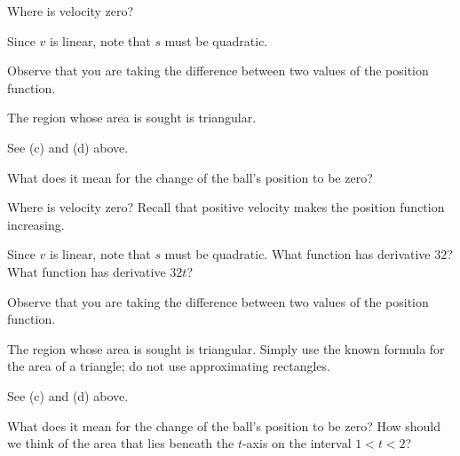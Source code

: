 \begin{smallhint}
\ba
	\item Where is velocity zero?
	\item Since $v$ is linear, note that $s$ must be quadratic.
	\item Observe that you are taking the difference between two values of the position function.
	\item The region whose area is sought is triangular.
	\item See (c) and (d) above.
	\item What does it mean for the change of the ball's position to be zero?
\ea
\end{smallhint}
\begin{bighint}
\ba
	\item Where is velocity zero? Recall that positive velocity makes the position function increasing.
	\item Since $v$ is linear, note that $s$ must be quadratic.  What function has derivative $32$?  What function has derivative $32t$?
	\item Observe that you are taking the difference between two values of the position function.
	\item The region whose area is sought is triangular.  Simply use the known formula for the area of a triangle; do not use approximating rectangles.
	\item See (c) and (d) above.
	\item What does it mean for the change of the ball's position to be zero?  How should we think of the area that lies beneath the $t$-axis on the interval $1 < t < 2$?
\ea
\end{bighint}
